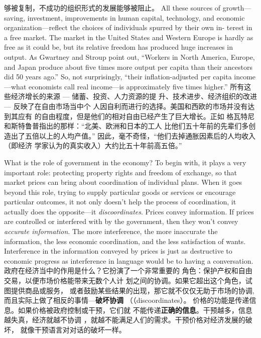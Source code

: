 \begin{paracol}{2}
够被复制，不成功的组织形式的发展能够被阻止。
\switchcolumn*
All these sources of growth---saving, investment, improvements in human capital, technology, and economic organization---reflect the choices of individuals spurred by their own in-
terest in a free market. The market in the United States and
Western Europe is hardly as free as it could be, but its relative
freedom has produced huge increases in output. As Gwartney
and Stroup point out, ``Workers in North America, Europe, and
Japan produce about five times more output per capita than
their ancestors did 50 years ago.'' So, not surprisingly, ``their inflation-adjusted per capita income---what economists call real
income---is approximately five times higher.''
\switchcolumn
所有这些经济增长的来源 --- 储蓄、投资、人力资源的提
升、技术进步、经济组织的改进 --- 反映了在自由市场当中个
人因自利而进行的选择。美国和西欧的市场并没有达到其应有
的自由程度，但是他们的相对自由已经产生了巨大增长。正如
格瓦特尼和斯特鲁普指出的那样：“北美、欧洲和日本的工人
比他们五十年前的先辈们多创造出了五倍以上的人均产值。”
因此，毫不奇怪，“他们去掉通胀因素后的人均收入（即经济
学家认为的真实收入）大约比五十年前高五倍。”

What is the role of government in the economy? To begin with,
it plays a very important role: protecting property rights and
freedom of exchange, so that market prices can bring about coordination of individual plans. When it goes beyond this role,
trying to supply particular goods or services or encourage particular outcomes, it not only doesn't help the process of coordination, it actually does the opposite---it \textit{discoordinates}. Prices convey information. If prices are controlled or interfered with by the government, then they won't convey \textit{accurate information}.
The more interference, the more inaccurate the information,
the less economic coordination, and the less satisfaction of
wants. Interference in the information conveyed by prices is just
as destructive to economic progress as interference in language
would be to having a conversation.
\switchcolumn
政府在经济当中的作用是什么？它扮演了一个非常重要的
角色：保护产权和自由交易，以便市场价格能带来无数个人计
划之间的协调。如果它超出这个角色，试图提供商品或服务，
或者鼓励某些结果的出现，那它就不仅仅无助于市场的协调,而且实际上做了相反的事情---\textbf{破坏协调} （（discoordinates）。
价格的功能是传递信息。如果价格被政府控制或干预，它们就
不能传递\textbf{正确的信息}。干预越多，信息越失真，经济就越不协调 ，就越不能满足人们的需求。干预价格对经济发展的破坏，
就像干预语言对对话的破坏一样。


\end{paracol}
